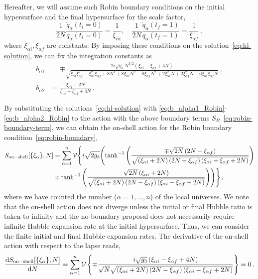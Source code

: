 \documentclass[superscriptaddress,aps,preprintnumbers,nofootinbib]{revtex4-2}
\begin{document}
Hereafter, we will assume such Robin boundary conditions on the initial hypersurface and the final hypersurface for the scale factor,
\begin{equation}\label{eq:robin-boundary}
\frac{1}{2N}
\frac{\dot{q}_{\alpha}(t_{i}=0)}{q_{\alpha}(t_{i}=0)}
=\frac{1}{\xi_{\alpha i}}, \quad \frac{1}{2N}
\frac{\dot{q}_{\alpha}(t_{f}=1)}{q_{\alpha}(t_{f}=1)}
=\frac{1}{\xi_{\alpha f}}\,,
\end{equation}
where $\xi_{\alpha i},\xi_{\alpha f}$ are constants. By imposing these conditions on the solution~\eqref{eq:hl-solution}, we can fix the integration constants as
\begin{align}
b_{\alpha 1}&=\mp\frac{2 i \sqrt{g_3} N^{3/2} \left(\xi_{\alpha i}-\xi_{\alpha f}+4 N\right)}{\sqrt{\xi_{\alpha i} \xi_{\alpha f}^2-\xi_{\alpha i}^2 \xi_{\alpha f}+8 N^3+8 \xi_{\alpha i} N^2-8 \xi_{\alpha f} N^2+2 \xi _{\alpha i}^2 N+2 \xi_{\alpha f}^2 N-6 \xi_{\alpha i} \xi_{\alpha f} N}}\,, \label{eq:b_alpha1_Robin} \\
b_{\alpha 2}&=\frac{\xi_{\alpha f}-2 N}{\xi_{\alpha i}-\xi_{\alpha f}+4 N}\,.\label{eq:b_alpha2_Robin}
\end{align}


By substituting the solutions~\eqref{eq:hl-solution} with \eqref{eq:b_alpha1_Robin}-\eqref{eq:b_alpha2_Robin} to the action with the above boundary terms $S_B$~\eqref{eq:robin-boundary-term}, we can obtain the on-shell action for the Robin boundary condition~\eqref{eq:robin-boundary},
\begin{align}\label{eq:on-shell-Robin}
\begin{split}
S_{\rm on-shell}[\{\xi_{\alpha}\},N]&=
\sum_{\alpha=1}^n{\cal V}\Biggl\{i \sqrt{2 g_3} \Biggl(\tanh ^{-1}\left(\frac{\mp \sqrt{2 N} \left(2 N- \xi_{\alpha f}\right)}{\sqrt{\left(\xi_{\alpha i}+2 N\right) \left(2 N-\xi_{\alpha f}\right) \left(\xi_{\alpha i}-\xi_{\alpha f}+2 N\right)}}\right) \\
& \mp\tanh ^{-1}\left(\frac{\sqrt{2 N} \left(\xi_{\alpha i}+2 N\right)}{\sqrt{\left(\xi_{\alpha i}+2 N\right) \left(2 N-\xi_{\alpha f}\right) \left(\xi_{\alpha i}-\xi_{\alpha f}+2 N\right)}}\right)\Biggr)\Biggr\}\,,
\end{split}
\end{align}
where we have counted the number ($\alpha=1,\dots, n$) of the local universes. We note that the on-shell action does not diverge unless the initial or final Hubble ratio is taken to infinity and the no-boundary proposal does not necessarily require infinite Hubble expansion rate at the initial hypersurface. Thus, we can consider the finite initial and final Hubble expansion rates. The derivative of the on-shell action with respect to the lapse reads,
\begin{align}
\frac{\mathrm{d} S_{\rm on-shell}[\{\xi_{\alpha}\}, N]}{\mathrm{d} N}
=\sum_{\alpha=1}^n{\cal V}\left\{\mp\frac{i \sqrt{g_3} \left(\xi_{\alpha i}-\xi_{\alpha f}+4 N\right)}{\sqrt{N} \sqrt{\left(\xi_{\alpha i}+2 N\right) \left(2 N-\xi_{\alpha f}\right) \left(\xi_{\alpha i}-\xi_{\alpha f}+2 N\right)}}\right\}=0\,.
\end{align}
\end{document}
